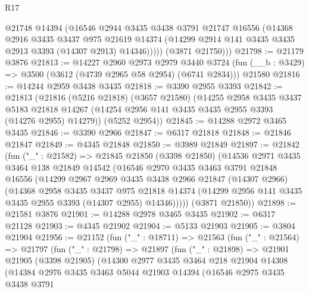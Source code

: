 \begin{lexlean}{R17}
\begin{coremodule}
            @21748
            @14394
            (@16546
              @2944
              @3435
              @3438
              @3791
              @21747
              @16556
              (@14368
                @2916
                @3435
                @3437
                @975
                @21619
                @14374
                (@14299 @2914 @141 @3435 @3435 @2913 @3393 (@14307 @2913) @14346)))))
        (@3871 @21750)))
@21798 := @21179 @3876
@21813 := @14227
    @2960
    @2973
    @2979
    @3440
    @3724
    (fun (__b : @3429) => @3500 (@3612 (@4739 @2965 @58 @2954) (@6741 @2834)))
    @21580
@21816 := @14244 @2959 @3438 @3435
@21818 := @3390 @2955 @3393
@21842 := @21813
    (@21816
      (@5216 @21818)
      (@3657 @21580)
      (@14255
        @2958
        @3435
        @3437
        @5183
        @21818
        @14267
        (@14254 @2956 @141 @3435 @3435 @2955 @3393 (@14276 @2955) @14279))
      (@5252 @2954))
@21845 := @14288 @2972 @3465 @3435
@21846 := @3390 @2966
@21847 := @6317 @21818
@21848 := @21846 @21847
@21849 := @4345 @21848
@21850 := @3989 @21849
@21897 := @21842
    (fun ("_" : @21582) =>
    @21845
      @21850
      (@3398 @21850)
      (@14536
        @2971
        @3435
        @3464
        @138
        @21849
        @14542
        (@16546
          @2970
          @3435
          @3463
          @3791
          @21848
          @16556
          (@14299
            @2967
            @2969
            @3435
            @3438
            @2966
            @21847
            (@14307 @2966)
            (@14368
              @2958
              @3435
              @3437
              @975
              @21818
              @14374
              (@14299 @2956 @141 @3435 @3435 @2955 @3393 (@14307 @2955) @14346)))))
      (@3871 @21850))
@21898 := @21581 @3876
@21901 := @14288 @2978 @3465 @3435
@21902 := @6317 @21128
@21903 := @4345 @21902
@21904 := @5133 @21903
@21905 := @3804 @21904
@21956 := @21152
    (fun ("_" : @18711) =>
    @21563
      (fun ("_" : @21564) =>
      @21797
        (fun ("_" : @21798) =>
        @21897
          (fun ("_" : @21898) =>
          @21901
            @21905
            (@3398 @21905)
            (@14300
              @2977
              @3435
              @3464
              @218
              @21904
              @14308
              (@14384
                @2976
                @3435
                @3463
                @5044
                @21903
                @14394
                (@16546
                  @2975
                  @3435
                  @3438
                  @3791

\end{coremodule}
\end{lexlean}
